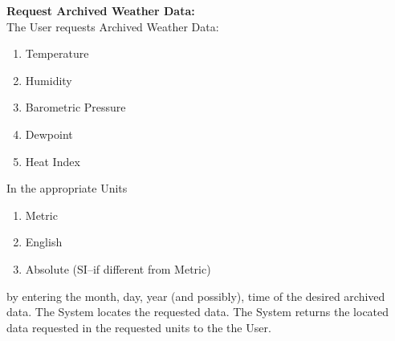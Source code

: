 \documentclass[letterpaper]{article}
\begin{document}
\noindent
\textbf{Request Archived Weather Data:  }\\
The User requests Archived Weather Data:
\begin{enumerate}
\item Temperature
\item Humidity
\item Barometric Pressure
\item Dewpoint
\item Heat Index
\end{enumerate}
In the appropriate Units
\begin{enumerate}
\item Metric
\item English
\item Absolute (SI--if different from Metric)
\end{enumerate}
by entering the month, day, year (and possibly), time of the desired
archived data.  The System locates the requested data.  The System
returns the located data requested in the requested units to the the
User.
\end{document}
